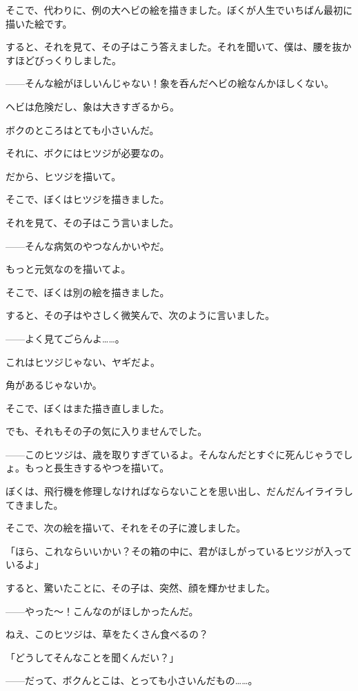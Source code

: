 そこで、代わりに、例の大ヘビの絵を描きました。ぼくが人生でいちばん最初に描いた絵です。

すると、それを見て、その子はこう答えました。それを聞いて、僕は、腰を抜かすほどびっくりしました。

——そんな絵がほしいんじゃない！象を呑んだヘビの絵なんかほしくない。


ヘビは危険だし、象は大きすぎるから。

ボクのところはとても小さいんだ。

それに、ボクにはヒツジが必要なの。

だから、ヒツジを描いて。

そこで、ぼくはヒツジを描きました。

それを見て、その子はこう言いました。

——そんな病気のやつなんかいやだ。

もっと元気なのを描いてよ。

そこで、ぼくは別の絵を描きました。

すると、その子はやさしく微笑んで、次のように言いました。


——よく見てごらんよ……。

これはヒツジじゃない、ヤギだよ。

角があるじゃないか。

そこで、ぼくはまた描き直しました。

でも、それもその子の気に入りませんでした。

——このヒツジは、歳を取りすぎているよ。そんなんだとすぐに死んじゃうでしょ。もっと長生きするやつを描いて。

ぼくは、飛行機を修理しなければならないことを思い出し、だんだんイライラしてきました。

そこで、次の絵を描いて、それをその子に渡しました。

「ほら、これならいいかい？その箱の中に、君がほしがっているヒツジが入っているよ」

すると、驚いたことに、その子は、突然、顔を輝かせました。


——やった～！こんなのがほしかったんだ。

ねえ、このヒツジは、草をたくさん食べるの？

「どうしてそんなことを聞くんだい？」

——だって、ボクんとこは、とっても小さいんだもの……。

